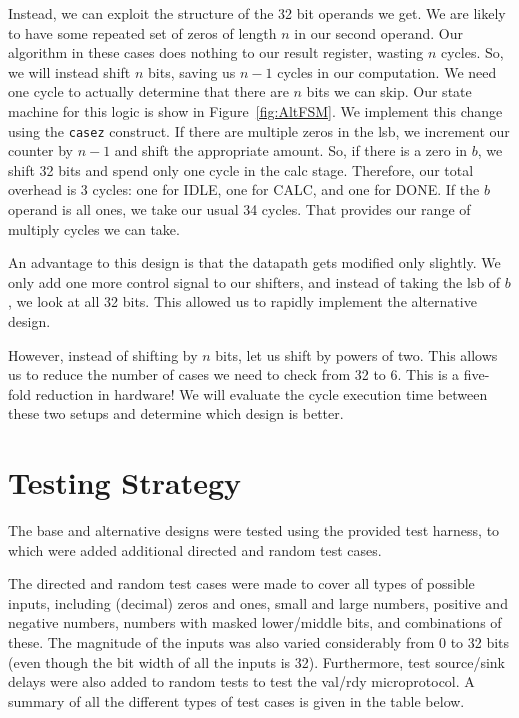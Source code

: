 \documentclass[11pt]{article}
\begin{document}
Instead, we can exploit the structure of the 32 bit operands we get.
We are likely to have some repeated set of zeros of length $n$ in our second operand.
Our algorithm in these cases does nothing to our result register, wasting $n$ cycles.
So, we will instead shift $n$ bits, saving us $n-1$ cycles in our computation.
We need one cycle to actually determine that there are $n$ bits we can skip.
Our state machine for this logic is show in Figure~\ref{fig:AltFSM}.
We implement this change using the \verb+casez+ construct.
If there are multiple zeros in the lsb, we increment our counter by $n-1$ and shift the appropriate amount.
So, if there is a zero in $b$, we shift 32 bits and spend only one cycle in the calc stage.
Therefore, our total overhead is 3 cycles: one for IDLE, one for CALC, and one for DONE.
If the $b$ operand is all ones, we take our usual 34 cycles.
That provides our range of multiply cycles we can take.

An advantage to this design is that the datapath gets modified only slightly.
We only add one more control signal to our shifters, and instead of taking the lsb of $b$, we look at all 32 bits.
This allowed us to rapidly implement the alternative design.

However, instead of shifting by $n$ bits, let us shift by powers of two.
This allows us to reduce the number of cases we need to check from 32 to 6.
This is a five-fold reduction in hardware!
We will evaluate the cycle execution time between these two setups and determine which design is better.   


\section{Testing Strategy}

The base and alternative designs were tested using the provided test harness, to which were added additional directed and random test cases.

The directed and random test cases were made to cover all types of possible inputs, including (decimal) zeros and ones, small and large numbers, positive and negative numbers, numbers with masked lower/middle bits, and combinations of these. The magnitude of the inputs was also varied considerably from 0 to 32 bits (even though the bit width of all the inputs is 32). Furthermore, test source/sink delays were also added to random tests to test the val/rdy microprotocol. A summary of all the different types of test cases is given in the table below.
\end{document}
